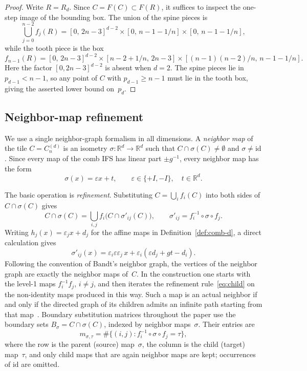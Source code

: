 \documentclass{amsart}
\theoremstyle{definition}
\theoremstyle{remark}
\newcommand{\R}{\mathbb{R}}
\begin{document}
\begin{proof}
Write $R=R_d$.  Since $C=F(C)\subset F(R)$, it suffices to inspect the
one-step image of the bounding box.  The union of the spine pieces is
\[
  \bigcup_{j=0}^{n-2} f_j(R)
  = [0,\,2n{-}3]^{d-2} \times [0,\,n{-}1{-}1/n]
    \times [0,\,n{-}1{-}1/n],
\]
while the tooth piece is the box
\[
  f_{n-1}(R) = [0,\,2n{-}3]^{d-2}
    \times [n{-}2{+}1/n,\,2n{-}3]
    \times [(n{-}1)(n{-}2)/n,\,n{-}1{-}1/n].
\]
Here the factor $[0,2n{-}3]^{d-2}$ is absent when $d=2$.  The spine
pieces lie in $p_{d-1} < n{-}1$, so any point of $C$ with
$p_{d-1} \ge n{-}1$ must lie in the tooth box, giving the
asserted lower bound on~$p_d$.
\end{proof}

\subsection{Neighbor-map refinement}
\label{ssec:neighbor-formalism}

We use a single neighbor-graph formalism in all dimensions.  A
\emph{neighbor map} of the tile $C=C_n^{(d)}$ is an isometry
$\sigma\colon \R^d\to\R^d$ such that
$C\cap\sigma(C)\ne\emptyset$ and $\sigma\ne\mathrm{id}$.
Since every map of the comb IFS has linear part $\pm g^{-1}$,
every neighbor map has the form
\[
  \sigma(x)=\varepsilon x+t,
  \qquad \varepsilon\in\{+I,-I\},\quad t\in\R^d.
\]

The basic operation is \emph{refinement}.  Substituting
$C=\bigcup_i f_i(C)$ into both sides of $C\cap\sigma(C)$ gives
\[
  C \cap \sigma(C)
  = \bigcup_{i,j} f_i\bigl(C \cap \sigma'_{ij}(C)\bigr),
  \qquad
  \sigma'_{ij}=f_i^{-1}\circ\sigma\circ f_j.
\]
Writing $h_j(x)=\varepsilon_j x+d_j$ for the affine maps in
Definition~\ref{def:comb-d}, a direct calculation gives
\begin{equation}\label{eq:child}
  \sigma'_{ij}(x)
  = \varepsilon_i\varepsilon\varepsilon_j\,x
  + \varepsilon_i(\varepsilon d_j+g t-d_i).
\end{equation}
Following the convention of Bandt's neighbor graph, the vertices of the
neighbor graph are exactly the neighbor maps of~\(C\).  In the
construction one starts with the level-1 maps \(f_i^{-1}f_j\),
\(i\ne j\), and then iterates the refinement rule~\eqref{eq:child} on
the non-identity maps produced in this way.  Such a map is an actual
neighbor if and only if the directed graph of its children admits an
infinite path starting from that map~\cite{lau-ngai}.  Boundary
substitution matrices throughout the paper use the boundary sets
\(B_\sigma=C\cap\sigma(C)\), indexed by neighbor maps~\(\sigma\).  Their
entries are
\[
  m_{\sigma,\tau}
  =\#\{(i,j): f_i^{-1}\circ\sigma\circ f_j=\tau\},
\]
where the row is the parent (source) map~\(\sigma\), the column is the
child (target) map~\(\tau\), and only child maps that are again neighbor
maps are kept; occurrences of \(\mathrm{id}\) are omitted.
\end{document}
